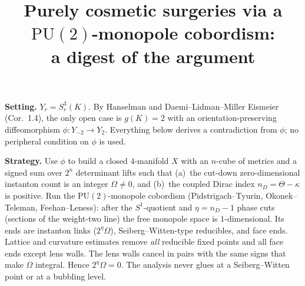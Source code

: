 \documentclass[10pt]{amsart}
\title{Purely cosmetic surgeries via a $\mathrm{PU}(2)$-monopole cobordism:\\ a digest of the argument}
\date{}
\begin{document}
\maketitle
\vspace{-2.5em}

\noindent\textbf{Setting.} $Y_r=S^3_r(K)$. By Hanselman and
Daemi--Lidman--Miller Eismeier (Cor.~1.4), the only open case is $g(K)=2$
with an orientation-preserving diffeomorphism $\phi\colon Y_{-2}\to Y_2$.
Everything below derives a contradiction from $\phi$; no peripheral
condition on $\phi$ is used.

\noindent\textbf{Strategy.} Use $\phi$ to build a closed $4$-manifold $X$
with an $n$-cube of metrics and a signed sum over $2^n$ determinant lifts
such that (a)~the cut-down zero-dimensional instanton count is an integer
$\Omega\ne0$, and (b)~the coupled Dirac index $n_D=\Theta-\kappa$ is
positive. Run the $\mathrm{PU}(2)$-monopole cobordism
(Pidstrigach--Tyurin, Okonek--Teleman, Feehan--Leness): after the
$S^1$-quotient and $\eta=n_D-1$ phase cuts (sections of the weight-two
line) the free monopole space is $1$-dimensional. Its ends are instanton
links ($2^\eta\Omega$), Seiberg--Witten-type reducibles, and face ends.
Lattice and curvature estimates remove \emph{all} reducible fixed points
and all face ends except lens walls. The lens walls cancel in pairs with the
same signs that make $\Omega$ integral. Hence $2^\eta\Omega=0$. The analysis
never glues at a Seiberg--Witten point or at a bubbling level.
\end{document}
